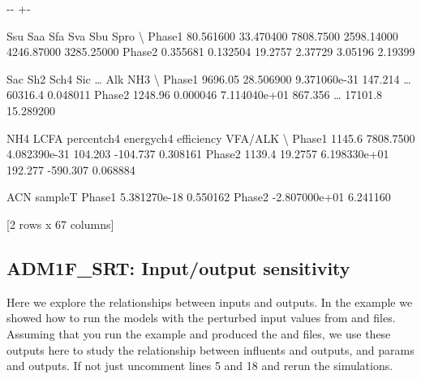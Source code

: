 \documentclass[a4paper,10pt,english]{sphinxmanual}
\newlength\nbsphinxcodecellspacing
\begin{document}
{

\kern-\sphinxverbatimsmallskipamount\kern-\baselineskip
\kern+\FrameHeightAdjust\kern-\fboxrule
\vspace{\nbsphinxcodecellspacing}

\begin{sphinxVerbatim}[commandchars=\\\{\}]
\llap{\color{nbsphinxout}[16]:\,\hspace{\fboxrule}\hspace{\fboxsep}}             Ssu        Saa        Sfa         Sva         Sbu        Spro   \textbackslash{}
Phase1  80.561600  33.470400  7808.7500  2598.14000  4246.87000  3285.25000
Phase2   0.355681   0.132504    19.2757     2.37729     3.05196     2.19399

           Sac        Sh2          Sch4      Sic   {\ldots}     Alk        NH3   \textbackslash{}
Phase1  9696.05  28.506900  9.371060e-31  147.214  {\ldots}  60316.4   0.048011
Phase2  1248.96   0.000046  7.114040e+01  867.356  {\ldots}  17101.8  15.289200

          NH4       LCFA    percentch4    energych4   efficiency   VFA/ALK  \textbackslash{}
Phase1  1145.6  7808.7500  4.082390e-31      104.203    -104.737  0.308161
Phase2  1139.4    19.2757  6.198330e+01      192.277    -590.307  0.068884

                 ACN   sampleT
Phase1  5.381270e-18  0.550162
Phase2 -2.807000e+01  6.241160

[2 rows x 67 columns]
\end{sphinxVerbatim}
}

{
\begin{sphinxVerbatim}[commandchars=\\\{\}]
\llap{\color{nbsphinxin}[ ]:\,\hspace{\fboxrule}\hspace{\fboxsep}}
\end{sphinxVerbatim}
}


\subsection{ADM1F\_SRT: Input/output sensitivity}
\label{\detokenize{jupyter_notebook/io_sensitivity_analysis:ADM1F_SRT:-Input/output-sensitivity}}\label{\detokenize{jupyter_notebook/io_sensitivity_analysis::doc}}
\sphinxAtStartPar
Here we explore the relationships between inputs and outputs. In the  example we showed how to run the models with the perturbed input values from  and  files. Assuming that you run the  example and produced the  and  files, we use these outputs here to study the relationship between influents and outputs, and params and outputs. If not just uncomment lines 5 and 18 and
re\sphinxhyphen{}run the simulations.
\end{document}
